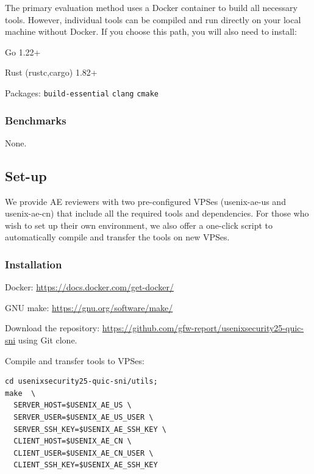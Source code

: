 The primary evaluation method uses a Docker container to
build all necessary tools. However, individual tools
can be compiled and run directly on your local machine
without Docker. If you choose this path,
you will also need to install:
\begin{compactitem}
    \item Go 1.22+
    \item Rust (rustc,cargo) 1.82+
    \item Packages: \texttt{build-essential} \texttt{clang} \texttt{cmake}
\end{compactitem}

\subsubsection{Benchmarks}
None.

\subsection{Set-up}

We provide AE reviewers with two pre-configured VPSes (usenix-ae-us and usenix-ae-cn)
that include all the required tools and dependencies.
For those who wish to set up their own environment,
we also offer a one-click script to automatically
compile and transfer the tools on new VPSes.


\subsubsection{Installation}

\begin{compactitem}
    \item Docker: \url{https://docs.docker.com/get-docker/}
    \item GNU make: \url{https://gnu.org/software/make/}
    \item Download the repository: \url{https://github.com/gfw-report/usenixsecurity25-quic-sni} using Git clone.
    \item Compile and transfer tools to VPSes:
\begin{verbatim}
cd usenixsecurity25-quic-sni/utils;
make  \
  SERVER_HOST=$USENIX_AE_US \
  SERVER_USER=$USENIX_AE_US_USER \
  SERVER_SSH_KEY=$USENIX_AE_SSH_KEY \
  CLIENT_HOST=$USENIX_AE_CN \
  CLIENT_USER=$USENIX_AE_CN_USER \
  CLIENT_SSH_KEY=$USENIX_AE_SSH_KEY
\end{verbatim}
\end{compactitem}

